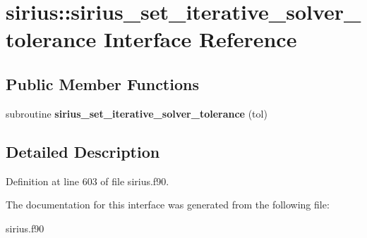 \hypertarget{interfacesirius_1_1sirius__set__iterative__solver__tolerance}{}\section{sirius\+:\+:sirius\+\_\+set\+\_\+iterative\+\_\+solver\+\_\+tolerance Interface Reference}
\label{interfacesirius_1_1sirius__set__iterative__solver__tolerance}
\subsection*{Public Member Functions}
\begin{DoxyCompactItemize}
\item 
\hypertarget{interfacesirius_1_1sirius__set__iterative__solver__tolerance_a28fa45f4522221734ec36560ceea90fb}{}subroutine {\bfseries sirius\+\_\+set\+\_\+iterative\+\_\+solver\+\_\+tolerance} (tol)\label{interfacesirius_1_1sirius__set__iterative__solver__tolerance_a28fa45f4522221734ec36560ceea90fb}

\end{DoxyCompactItemize}


\subsection{Detailed Description}


Definition at line 603 of file sirius.\+f90.



The documentation for this interface was generated from the following file\+:\begin{DoxyCompactItemize}
\item 
sirius.\+f90\end{DoxyCompactItemize}

